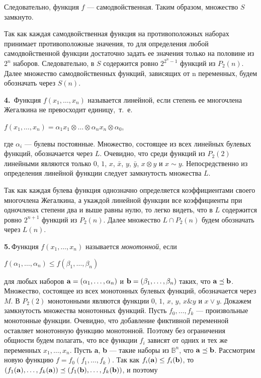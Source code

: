 \documentclass[10pt]{article}
\begin{document}
Следовательно, функция $f$ — самодвойственная. Таким образом, множество
$S$ замкнуто. \par
Так как каждая самодвойственная функция на противоположных наборах
принимает противоположные значения, то для определения любой
самодвойственной функции достаточно задать ее значения только на половине
из $2^n$ наборов. Следовательно, в $S$ содержится ровно $2^{2^n−1}$ функций
из $P_2(n)$. Далее множество самодвойственных функций, зависящих от n
переменных, будем обозначать через $S(n)$.\par
{\bf{4.}}\, Функция $f(x_1, \dots,x_n)$ называется линейной, если степень ее многочлена
Жегалкина не превосходит единицу,~т.~е.
\begin{center} $f(x_1, \dots, x_n) = \alpha_1 x_1 \otimes \dots \otimes \alpha_n x_n \otimes \alpha_0$,\end{center}
где $\alpha_i$ — булевы постоянные. Множество, состоящее из всех линейных булевых
функций, обозначается через $L$. Очевидно, что среди функций из $P_2(2)$
линейными являются только $0$, $1$, $x$, $\bar{x}$, $y$, $\bar{y}$, $x \otimes y$ и $x \sim y$. Непосредственно
из определения линейной функции следует замкнутость множества $L$.\par
Так как каждая булева функция однозначно определяется коэффициентами
своего многочлена Жегалкина, а укаждой линейной функции все
коэффициенты при одночленах степени два и выше равны нулю, то легко
видеть, что в $L$ содержится ровно $2^{n+1}$ функций из $P_2(n)$.
Далее множество $L \cap P_2(n)$ будем обозначать через $L(n)$.\par
{\bf{5.}}\,Функция $f(x_1, \dots, x_n)$ называется \textit{монотонной}, если
\begin{center} $f(\alpha_1, \dots, \alpha_n) \le f(\beta_1, \dots, \beta_n)$\end{center}
для любых наборов ${\bf{a}}=(\alpha_1, \dots, \alpha_n)$ и ${\bf{b}}=(\beta_1, \dots, \beta_n)$ таких,
что ${\bf a}\preceq{\bf b}$. Множество, состоящее из всех монотонных булевых функций, обозначается через $M$.
В $P_2(2)$ монотонными являются функции 0, $1$, $x$, $y$, $x \& y$ и $x \vee y$.
Докажем замкнутость множества монотонных функций. Пусть $f_0, \dots, f_k$
— произвольные монотонные функции. Очевидно, что добавление фиктивной
переменной оставляет монотонную функцию монотонной. Поэтому без
ограничения общности будем полагать, что все функции $f_i$ зависят от одних
и тех же переменных $x_1, \dots, x_n$. Пусть {\bf{a}}, {\bf{b}} — такие наборы из $\mathbb{B}^n$, что ${\bf{a}} \preceq {\bf{b}}$.
Рассмотрим новую функцию $f=f_0(f_1, \dots, f_k)$. Так как $f_i({\bf{a}}) \le f_i({\bf{b}})$, то $(f_1({\bf{a}}), \dots, f_k({\bf{a}})) \preceq (f_1({\bf{b}}), \dots, f_k({\bf{b}}))$, и поэтому
\end{document}
